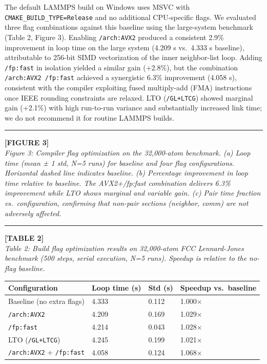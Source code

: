 \documentclass[
  11pt,
]{article}
\newcounter{none} %
\begin{document}
The default LAMMPS build on Windows uses MSVC with
\texttt{CMAKE\_BUILD\_TYPE=Release} and no additional CPU-specific
flags. We evaluated three flag combinations against this baseline using
the large-system benchmark (Table 2, Figure 3). Enabling
\texttt{/arch:AVX2} produced a consistent 2.9\% improvement in loop time
on the large system (4.209 s vs.~4.333 s baseline), attributable to
256-bit SIMD vectorization of the inner neighbor-list loop. Adding
\texttt{/fp:fast} in isolation yielded a similar gain (+2.8\%), but the
combination \texttt{/arch:AVX2\ /fp:fast} achieved a synergistic 6.3\%
improvement (4.058 s), consistent with the compiler exploiting fused
multiply-add (FMA) instructions once IEEE rounding constraints are
relaxed. LTO (\texttt{/GL+LTCG}) showed marginal gain (+2.1\%) with high
run-to-run variance and substantially increased link time; we do not
recommend it for routine LAMMPS builds.

\begin{center}\rule{0.5\linewidth}{0.5pt}\end{center}

\textbf{{[}FIGURE 3{]}}\\
\emph{Figure 3: Compiler flag optimization on the 32,000-atom benchmark.
(a) Loop time (mean ± 1 std, N=5 runs) for baseline and four flag
configurations. Horizontal dashed line indicates baseline. (b)
Percentage improvement in loop time relative to baseline. The
AVX2+/fp:fast combination delivers 6.3\% improvement while LTO shows
marginal and variable gain. (c) Pair time fraction vs.~configuration,
confirming that non-pair sections (neighbor, comm) are not adversely
affected.}

\begin{center}\rule{0.5\linewidth}{0.5pt}\end{center}

\textbf{{[}TABLE 2{]}}\\
\emph{Table 2: Build flag optimization results on 32,000-atom FCC
Lennard-Jones benchmark (500 steps, serial execution, N=5 runs). Speedup
is relative to the no-flag baseline.}

{\def\LTcaptype{none} %
\begin{longtable}[]{@{}llll@{}}
\toprule\noalign{}
Configuration & Loop time (s) & Std (s) & Speedup vs.~baseline \\
\midrule\noalign{}
\endhead
\bottomrule\noalign{}
\endlastfoot
Baseline (no extra flags) & 4.333 & 0.112 & 1.000× \\
\texttt{/arch:AVX2} & 4.209 & 0.169 & 1.029× \\
\texttt{/fp:fast} & 4.214 & 0.043 & 1.028× \\
LTO (\texttt{/GL+LTCG}) & 4.245 & 0.199 & 1.021× \\
\texttt{/arch:AVX2} + \texttt{/fp:fast} & 4.058 & 0.124 & 1.068× \\
\end{longtable}
}
\end{document}
